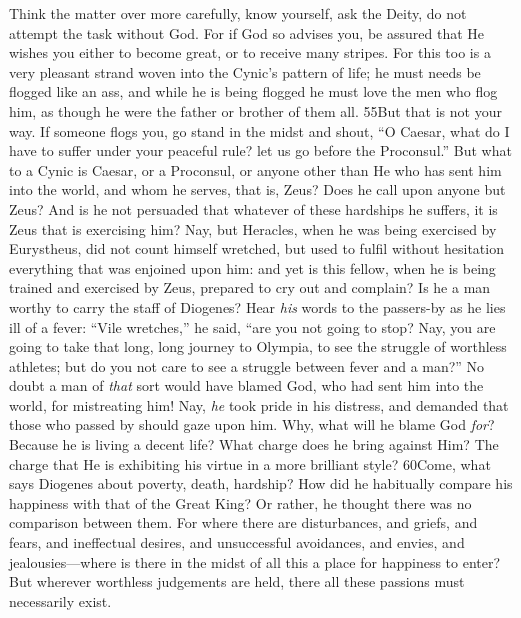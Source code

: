 Think the matter over more carefully, know yourself, ask the Deity, do not attempt the task without God. For if God so advises you, be assured that He wishes you either to become great, or to receive many stripes. For this too is a very pleasant strand woven into the Cynic's pattern of life; he must needs be flogged like an ass, and while he is being flogged he must love the men who flog him, as though he were the father or brother of them all. 55But that is not your way. If someone flogs you, go stand in the midst and shout, ``O Caesar, what do I have to suffer under your peaceful rule? let us go before the Proconsul.'' But what to a Cynic is Caesar, or a Proconsul, or anyone other than He who has sent him into the world, and whom he serves, that is, Zeus? Does he call upon anyone but Zeus? And is he not persuaded that whatever of these hardships he suffers, it is Zeus that is exercising him? Nay, but Heracles, when he was being exercised by Eurystheus, did not count himself wretched, but used to fulfil without hesitation everything that was enjoined upon him: and yet is this fellow, when he is being trained and exercised by Zeus, prepared to cry out and complain? Is he a man worthy to carry the staff of Diogenes? Hear \emph{his} words to the passers-by as he lies ill of a fever: ``Vile wretches,'' he said, ``are you not going to stop? Nay, you are going to take that long, long journey to Olympia, to see the struggle of worthless athletes; but do you not care to see a struggle between fever and a man?'' No doubt a man of \emph{that} sort would have blamed God, who had sent him into the world, for mistreating him! Nay, \emph{he} took pride in his distress, and demanded that those who passed by should gaze upon him. Why, what will he blame God \emph{for}? Because he is living a decent life? What charge does he bring against Him? The charge that He is exhibiting his virtue in a more brilliant style? 60Come, what says Diogenes about poverty, death, hardship? How did he habitually compare his happiness with that of the Great King? Or rather, he thought there was no comparison between them. For where there are disturbances, and griefs, and fears, and ineffectual desires, and unsuccessful avoidances, and envies, and jealousies—where is there in the midst of all this a place for happiness to enter? But wherever worthless judgements are held, there all these passions must necessarily exist.

